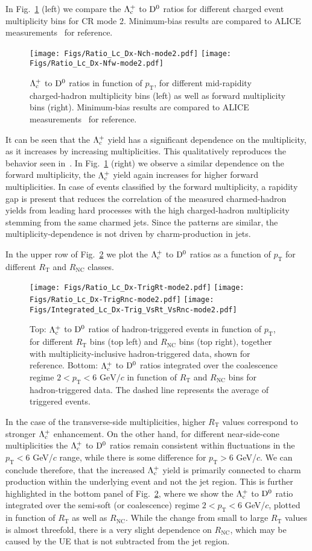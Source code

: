 \documentclass[aps,amsmath,amssymb,a4paper,11pt,superscriptaddress]{revtex4-2}
\newcommand*{\RT}{\ensuremath{R_\mathrm{T}}\xspace}
\newcommand*{\RNC}{\ensuremath{R_\mathrm{NC}}\xspace}
\newcommand*{\pT}{\ensuremath{p_\mathrm{T}}\xspace}
\newcommand*{\GeVc}{\ensuremath{\mathrm{GeV}/c}\xspace}
\newcommand*{\Lc}{\ensuremath{\Lambda_{\rm c}^+}\xspace}
\newcommand*{\Dz}{\ensuremath{\rm D^0}\xspace}
\begin{document}
In Fig.~\ref{fig:Mults} (left) we compare the \Lc to \Dz ratios for different charged event multiplicity bins for CR mode 2. Minimum-bias results are compared to ALICE measurements~\cite{ALICE:2020wfu} for reference.
%
\begin{figure}[ht!]%
\centering
\texttt{[image: Figs/Ratio\_Lc\_Dx-Nch-mode2.pdf]}%
\texttt{[image: Figs/Ratio\_Lc\_Dx-Nfw-mode2.pdf]}%
\caption{\Lc to \Dz ratios in function of \pT, for different mid-rapidity charged-hadron multiplicity bins (left) as well as forward multiplicity bins (right). Minimum-bias results are compared to ALICE measurements~\cite{ALICE:2020wfu} for reference.}
\label{fig:Mults}
\end{figure}
%
It can be seen that the \Lc yield has a significant dependence on the multiplicity, as it increases by increasing multiplicities. This qualitatively reproduces the behavior seen in~\cite{Hills:2021eto}. In Fig.~\ref{fig:Mults} (right) we observe a similar dependence on the forward multiplicity, the \Lc yield again increases for higher forward multiplicities.
In case of events classified by the forward multiplicity, a rapidity gap is present that reduces the correlation of the measured charmed-hadron yields from leading hard processes with the high charged-hadron multiplicity stemming from the same charmed jets. Since the patterns are similar, the multiplicity-dependence is not driven by charm-production in jets. 

In the upper row of Fig.~\ref{fig:RT_RNC} we plot the \Lc to \Dz ratios as a function of \pT for different \RT and \RNC classes. 
%
\begin{figure}[ht!]%
\centering
\texttt{[image: Figs/Ratio\_Lc\_Dx-TrigRt-mode2.pdf]}%
\texttt{[image: Figs/Ratio\_Lc\_Dx-TrigRnc-mode2.pdf]}
\texttt{[image: Figs/Integrated\_Lc\_Dx-Trig\_VsRt\_VsRnc-mode2.pdf]}%
\caption{Top: \Lc to \Dz ratios of hadron-triggered events in function of \pT, for different \RT bins (top left) and \RNC bins (top right), together with multiplicity-inclusive hadron-triggered data, shown for reference. Bottom: \Lc to \Dz ratios integrated over the coalescence regime $2<\pT<6$ \GeVc in function of \RT and \RNC bins for hadron-triggered data. The dashed line represents the average of triggered events.}
\label{fig:RT_RNC}
\end{figure}
%
In the case of the transverse-side multiplicities, higher \RT values correspond to stronger \Lc enhancement. On the other hand, for different near-side-cone multiplicities the \Lc to \Dz ratios remain consistent within fluctuations in the $\pT<6$ GeV/$c$ range, while there is some difference for $\pT>6$ GeV/$c$. We can conclude therefore, that the increased \Lc yield is primarily connected to charm production within the underlying event and not the jet region.
This is further highlighted in the bottom panel of Fig.~\ref{fig:RT_RNC}, where we show the \Lc to \Dz ratio integrated over the semi-soft (or coalescence) regime $2 <\pT<6$ GeV/$c$, plotted in function of \RT as well as \RNC. While the change from small to large \RT values is almost threefold, there is a very slight dependence on \RNC, which may be caused by the UE that is not subtracted from the jet region.
\end{document}
